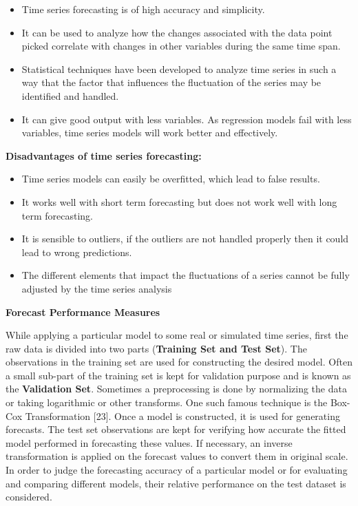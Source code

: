 \documentclass[12pt,a4paper]{book}
\begin{document}
{\begin{itemize}
\item
  Time series forecasting is of high accuracy and simplicity.
\item
  It can be used to analyze how the changes associated with the data
  point picked correlate with changes in other variables during the same
  time span.
\item
  Statistical techniques have been developed to analyze time series in
  such a way that the factor that influences the fluctuation of the
  series may be identified and handled.
\item
  It can give good output with less variables. As regression models fail
  with less variables, time series models will work better and
  effectively.
\end{itemize}

\textbf{Disadvantages of time series forecasting:}

\begin{itemize}
\item
  Time series models can easily be overfitted, which lead to false
  results.
\item
  It works well with short term forecasting but does not work well with
  long term forecasting.
\item
  It is sensible to outliers, if the outliers are not handled properly
  then it could lead to wrong predictions.
\item
  The different elements that impact the fluctuations of a series cannot
  be fully adjusted by the time series analysis
\end{itemize}

\textbf{Forecast Performance Measures}

While applying a particular model to some real or simulated time series,
first the raw data is divided into two parts (\textbf{Training Set and
Test Set}). The observations in the training set are used for
constructing the desired model. Often a small sub-part of the training
set is kept for validation purpose and is known as the
\textbf{Validation Set}. Sometimes a preprocessing is done by
normalizing the data or taking logarithmic or other transforms. One such
famous technique is the Box-Cox Transformation {[}23{]}. Once a model is
constructed, it is used for generating forecasts. The test set
observations are kept for verifying how accurate the fitted model
performed in forecasting these values. If necessary, an inverse
transformation is applied on the forecast values to convert them in
original scale. In order to judge the forecasting accuracy of a
particular model or for evaluating and comparing different models, their
relative performance on the test dataset is considered.

}
\end{document}
